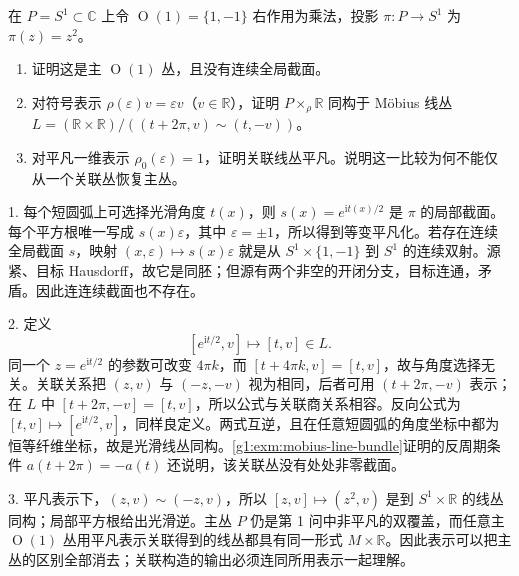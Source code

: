 \begin{exercise}\label{g1:ex:mobius-principal-double-cover}
	在 \(P=S^1\subset\mathbb C\) 上令 \(\operatorname{O}(1)=\{1,-1\}\) 右作用为乘法，投影 \(\pi:P\to S^1\) 为 \(\pi(z)=z^2\)。
	\begin{enumerate}
		\item 证明这是主 \(\operatorname{O}(1)\) 丛，且没有连续全局截面。
		\item 对符号表示 \(\rho(\varepsilon)v=\varepsilon v\)（\(v\in\mathbb R\)），证明 \(P\times_\rho\mathbb R\) 同构于 Möbius 线丛 \(L=(\mathbb R\times\mathbb R)/((t+2\pi,v)\sim(t,-v))\)。
		\item 对平凡一维表示 \(\rho_0(\varepsilon)=1\)，证明关联线丛平凡。说明这一比较为何不能仅从一个关联丛恢复主丛。
	\end{enumerate}
\end{exercise}
\begin{solution}
	1. 每个短圆弧上可选择光滑角度 \(t(x)\)，则 \(s(x)=e^{\mathrm{i}t(x)/2}\) 是 \(\pi\) 的局部截面。每个平方根唯一写成 \(s(x)\varepsilon\)，其中 \(\varepsilon=\pm1\)，所以得到等变平凡化。若存在连续全局截面 \(s\)，映射 \((x,\varepsilon)\mapsto s(x)\varepsilon\) 就是从 \(S^1\times\{1,-1\}\) 到 \(S^1\) 的连续双射。源紧、目标 Hausdorff，故它是同胚；但源有两个非空的开闭分支，目标连通，矛盾。因此连连续截面也不存在。

	2. 定义
	\[
		[e^{\mathrm{i}t/2},v]\longmapsto[t,v]\in L.
	\]
	同一个 \(z=e^{\mathrm{i}t/2}\) 的参数可改变 \(4\pi k\)，而 \([t+4\pi k,v]=[t,v]\)，故与角度选择无关。关联关系把 \((z,v)\) 与 \((-z,-v)\) 视为相同，后者可用 \((t+2\pi,-v)\) 表示；在 \(L\) 中 \([t+2\pi,-v]=[t,v]\)，所以公式与关联商关系相容。反向公式为 \([t,v]\mapsto[e^{\mathrm{i}t/2},v]\)，同样良定义。两式互逆，且在任意短圆弧的角度坐标中都为恒等纤维坐标，故是光滑线丛同构。\cref{g1:exm:mobius-line-bundle}证明的反周期条件 \(a(t+2\pi)=-a(t)\) 还说明，该关联丛没有处处非零截面。

	3. 平凡表示下，\((z,v)\sim(-z,v)\)，所以 \([z,v]\mapsto(z^2,v)\) 是到 \(S^1\times\mathbb R\) 的线丛同构；局部平方根给出光滑逆。主丛 \(P\) 仍是第 1 问中非平凡的双覆盖，而任意主 \(\operatorname{O}(1)\) 丛用平凡表示关联得到的线丛都具有同一形式 \(M\times\mathbb R\)。因此表示可以把主丛的区别全部消去；关联构造的输出必须连同所用表示一起理解。
\end{solution}

